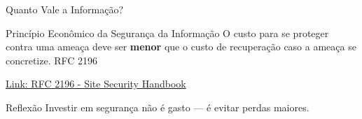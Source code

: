 \begin{frame}{Quanto Vale a Informação?}

\begin{block}{Princípio Econômico da Segurança da Informação}
O custo para se proteger contra uma ameaça deve ser \textbf{menor} que o custo de recuperação caso a ameaça se concretize. RFC 2196
\end{block}

\href{https://datatracker.ietf.org/doc/html/rfc2196}{Link: RFC 2196 - Site Security Handbook}

\vspace{0.5cm}

\begin{alertblock}{Reflexão}
Investir em segurança não é gasto — é evitar perdas maiores.
\end{alertblock}

\end{frame}


